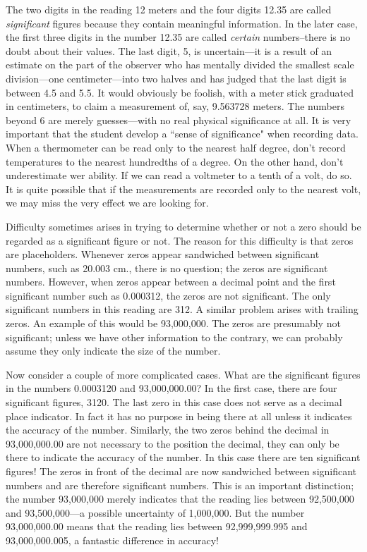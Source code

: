 \documentclass[main.tex]{subfiles}
\begin{document}
The two digits in the reading 12 meters and the four digits 12.35 are called \emph{significant} figures because they contain meaningful information.  In the later case, the first three digits in the number 12.35 are called \emph{certain} numbers--there is no doubt about their values.  The last digit, 5, is uncertain---it is a result of an estimate on the part of the observer who has mentally divided the smallest scale division---one centimeter---into two halves and has judged that the last digit is between 4.5 and 5.5.  It would obviously be foolish, with a meter stick graduated in centimeters, to claim a measurement of, say, 9.563728 meters.  The numbers beyond 6 are merely guesses---with no real physical significance at all. It is very important that the student develop a ``sense of significance" when recording data.  When a thermometer can be read only to the nearest half degree, don't record temperatures to the nearest hundredths of a degree.  On the other hand, don't underestimate wer ability.  If we can read a voltmeter to a tenth of a volt, do so.  It is quite possible that if the measurements are recorded only to the nearest volt, we may miss the very effect we are looking for.

Difficulty sometimes arises in trying to determine whether or not a zero should be regarded as a significant figure or not.  The reason for this difficulty is that zeros are placeholders.  Whenever zeros appear sandwiched between significant numbers, such as 20.003 cm., there is no question; the zeros are significant numbers. However, when zeros appear between a decimal point and the first significant number such as 0.000312, the zeros are not significant.  The only significant numbers in this reading are 312.  A similar problem arises with trailing zeros.  An example of this would be 93,000,000.  The zeros are presumably not significant; unless we have other information to the contrary, we can probably assume they only indicate the size of the number.

Now consider a couple of more complicated cases.  What are the significant figures in the numbers 0.0003120 and 93,000,000.00?  In the first case, there are four significant figures, 3120.  The last zero in this case does not serve as a decimal place indicator.  In fact it has no purpose in being there at all unless it indicates the accuracy of the number.  Similarly, the two zeros behind the decimal in 93,000,000.00 are not necessary to the position the decimal, they can only be there to indicate the accuracy of the number.  In this case there are ten significant figures!  The zeros in front of the decimal are now sandwiched between significant numbers and are therefore significant numbers.  This is an important distinction; the number 93,000,000 merely indicates that the reading lies between 92,500,000 and 93,500,000---a possible uncertainty of 1,000,000.  But the number 93,000,000.00 means that the reading lies between 92,999,999.995 and 93,000,000.005, a fantastic difference in accuracy!
\end{document}
